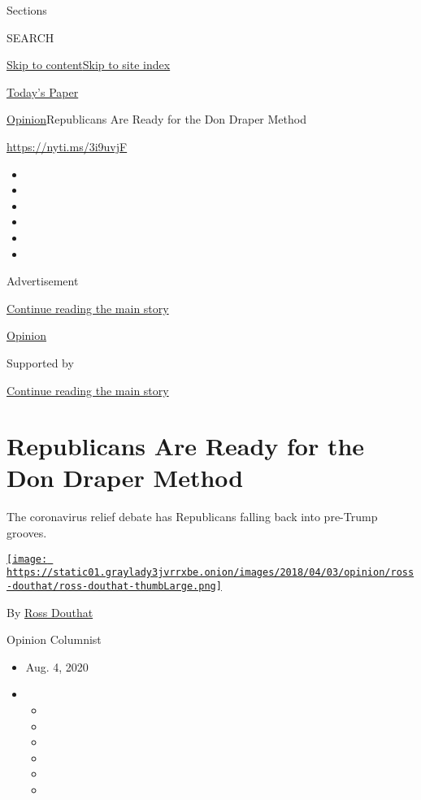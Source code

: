 Sections

SEARCH

\protect\hyperlink{site-content}{Skip to
content}\protect\hyperlink{site-index}{Skip to site index}

\href{https://myaccount.nytimes3xbfgragh.onion/auth/login?response_type=cookie\&client_id=vi}{}

\href{https://www.nytimes3xbfgragh.onion/section/todayspaper}{Today's
Paper}

\href{/section/opinion}{Opinion}\textbar{}Republicans Are Ready for the
Don Draper Method

\url{https://nyti.ms/3i9uvjF}

\begin{itemize}
\item
\item
\item
\item
\item
\item
\end{itemize}

Advertisement

\protect\hyperlink{after-top}{Continue reading the main story}

\href{/section/opinion}{Opinion}

Supported by

\protect\hyperlink{after-sponsor}{Continue reading the main story}

\hypertarget{republicans-are-ready-for-the-don-draper-method}{%
\section{Republicans Are Ready for the Don Draper
Method}\label{republicans-are-ready-for-the-don-draper-method}}

The coronavirus relief debate has Republicans falling back into
pre-Trump grooves.

\href{https://www.nytimes3xbfgragh.onion/by/ross-douthat}{\texttt{[image: https://static01.graylady3jvrrxbe.onion/images/2018/04/03/opinion/ross-douthat/ross-douthat-thumbLarge.png]}}

By \href{https://www.nytimes3xbfgragh.onion/by/ross-douthat}{Ross
Douthat}

Opinion Columnist

\begin{itemize}
\item
  Aug. 4, 2020
\item
  \begin{itemize}
  \item
  \item
  \item
  \item
  \item
  \item
  \end{itemize}
\end{itemize}

